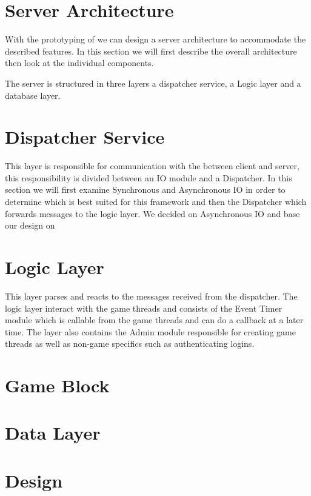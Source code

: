 \section{Server Architecture}
\label{sec:server}
With the prototyping of  we can design a server architecture to accommodate the described features. In this section we will first describe the overall architecture then look at the individual components.


The server is structured in three layers a dispatcher service, a Logic layer and a database layer. 




\section{Dispatcher Service}
This layer is responsible for communication with the between client and server, this responsibility is divided between an IO module and a Dispatcher. In this section we will first examine Synchronous and Asynchronous IO in order to determine which is best suited for this framework and then the Dispatcher which forwards messages to the logic layer. We decided on Asynchronous IO and base our design on \cite{?} 	 %







\section{Logic Layer}
This layer parses and reacts to the messages received from the dispatcher. The logic layer interact with the game threads and consists of the Event Timer module which is callable from the game threads and can do a callback at a later time. The layer also contains the Admin module responsible for creating game threads as well as non-game specifics such as authenticating logins.




\section{Game Block}



\section{Data Layer}



\section{Design}